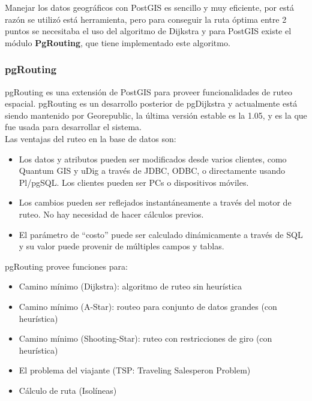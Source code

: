       Manejar los datos geográficos con PostGIS es sencillo y muy eficiente, por está raz\'on se utilizó está herramienta, pero para conseguir la ruta óptima entre 2 puntos se necesitaba el uso del algoritmo de Dijkstra y para PostGIS existe el módulo \textbf{PgRouting}, que tiene implementado este algoritmo.
      
      \subsubsection{pgRouting} %
      \label{sec:pgrouting}
        pgRouting es una extensi\'on  de  PostGIS para proveer funcionalidades de ruteo espacial. pgRouting es un desarrollo posterior de pgDijkstra y actualmente está siendo mantenido por Georepublic, la última versi\'on estable es la 1.05, y es la que fue usada para desarrollar el sistema.\\

        Las ventajas del ruteo en la base de datos son:
        \begin{itemize}
          \item Los datos y atributos pueden ser modificados desde varios clientes, como Quantum GIS y uDig a través de JDBC, ODBC, o directamente usando Pl/pgSQL. Los clientes pueden ser PCs o dispositivos móviles.
          \item Los cambios pueden ser reflejados instantáneamente a través del motor de ruteo. No hay necesidad de hacer cálculos previos.
          \item El parámetro de ``costo'' puede ser calculado dinámicamente a través de SQL y su valor puede provenir de múltiples campos y tablas.
        \end{itemize}

        pgRouting provee funciones para:
        \begin{itemize}
          \item Camino mínimo (Dijkstra): algoritmo de ruteo sin heurística
          \item Camino mínimo (A-Star): routeo para conjunto de datos grandes (con heurística)
          \item Camino mínimo (Shooting-Star): ruteo con restricciones de giro (con heurística)
          \item El problema del viajante (TSP: Traveling Salesperon Problem)
          \item Cálculo de ruta (Isolíneas)
        \end{itemize}
        
